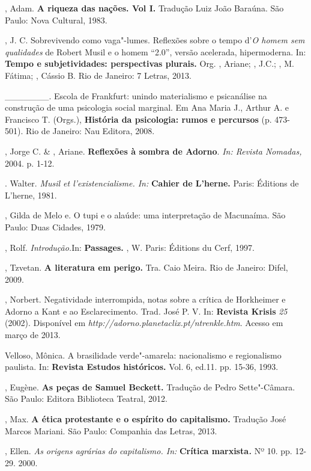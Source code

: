 \begin{Parskip}
, Adam. \textbf{A riqueza das nações. Vol I.} Tradução Luiz João
Baraúna. São Paulo: Nova Cultural, 1983.

, J. C. Sobrevivendo como vaga"-lumes. Reflexões sobre o tempo
d'\emph{O homem sem qualidades} de Robert Musil e o homem ``2.0'',
versão acelerada, hipermoderna. In: \textbf{Tempo e subjetividades:
perspectivas plurais.} Org. , Ariane; , J.C.; , M.
Fátima; , Cássio B. Rio de Janeiro: 7 Letras, 2013.

\_\_\_\_\_\_\_. Escola de Frankfurt: unindo materialismo e psicanálise
na construção de uma psicologia social marginal. Em Ana Maria J., Arthur
A. e Francisco T. (Orgs.), \textbf{História da psicologia: rumos e
percursos} (p. 473-501). Rio de Janeiro: Nau Editora, 2008.

, Jorge C. \& , Ariane. \textbf{Reflexões à sombra de
Adorno}. \emph{In: Revista Nomadas,} 2004. p. 1-12.

. Walter. \emph{Musil et l'existencialisme. In:} \textbf{Cahier de
L'herne.} Paris: Éditions de L'herne, 1981.

, Gilda de Melo e. O tupi e o alaúde: uma interpretação de
Macunaíma. São Paulo: Duas Cidades, 1979.

, Rolf. \emph{Introdução.}In: \textbf{Passages.} , W.
Paris: Éditions du Cerf, 1997.

, Tzvetan. \textbf{A literatura em perigo.} Tra. Caio Meira. Rio
de Janeiro: Difel, 2009.

, Norbert. Negatividade interrompida, notas sobre a crítica de
Horkheimer e Adorno a Kant e ao Esclarecimento. Trad. José P. V. In:
\textbf{Revista Krisis} \emph{25} (2002). Disponível em
\emph{http://adorno.planetaclix.pt/ntrenkle.htm}.
Acesso em março de 2013.

Velloso, Mônica. A brasilidade verde"-amarela: nacionalismo e
regionalismo paulista. In: \textbf{Revista Estudos históricos.} Vol. 6,
ed.11. pp. 15-36, 1993.

, Eugène. \textbf{As peças de Samuel Beckett.} Tradução de Pedro
Sette"-Câmara. São Paulo: Editora Biblioteca Teatral, 2012.

, Max. \textbf{A ética protestante e o espírito do capitalismo.}
Tradução José Marcos Mariani. São Paulo: Companhia das Letras, 2013.

, Ellen. \emph{As origens agrárias do capitalismo. In:}
\textbf{Crítica marxista\emph{. }}Nº 10. pp. 12-29. 2000.
\end{Parskip}